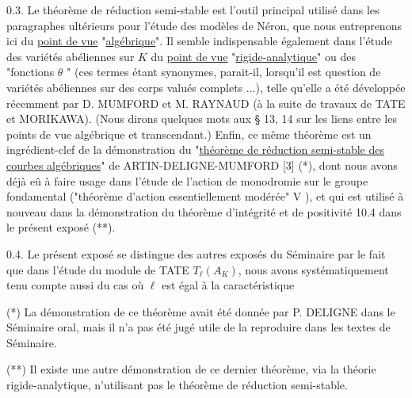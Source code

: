 0.3.  Le théorème de réduction semi-stable est l'outil principal utilisé dans les paragraphes ultérieurs pour l'étude des modèles de Néron, que nous entreprenons ici du \underline{point de vue} "\underline{algébrique}". Il semble indispensable également dans l'étude des variétés abéliennes sur $K$ du \underline{point de vue} "\underline{rigide-analytique}" ou des "fonctions $\theta$ " (ces termes étant synonymes, parait-il, lorsqu'il est question de variétés abéliennes sur des corps valués complets ...), telle qu'elle a été développée récemment par D. MUMFORD et M. RAYNAUD (à la suite de travaux de TATE et MORIKAWA). (Nous dirons quelques mots aux \S{} 13, 14 sur les liens entre les points de vue algébrique et transcendant.) Enfin, ce même théorème est un ingrédient-clef de la démonstration du "\underline{théorème de réduction semi-stable des courbes algébriques}" de ARTIN-DELIGNE-MUMFORD [3] (*), dont nous avons déjà eû à faire usage dans l'étude de l'action de monodromie sur le groupe fondamental ("théorème d'action essentiellement modérée" V \hspace{2em}), et qui est utilisé à nouveau dans la démonstration du théorème d'intégrité et de positivité 10.4 dans le présent exposé (**).

0.4.  Le présent exposé se distingue des autres exposés du Séminaire par le fait que dans l'étude du module de TATE $T_\ell(A_K)$, nous avons systématiquement tenu compte aussi du cas où $\ell$ est égal à la caractéristique

(*)  La démonstration de ce théorème avait été donnée par P. DELIGNE dans le Séminaire oral, mais il n'a pas été jugé utile de la reproduire dans les textes de Séminaire.

(**) Il existe une autre démonstration de ce dernier théorème, via la théorie rigide-analytique, n'utilisant pas le théorème de réduction semi-stable.



